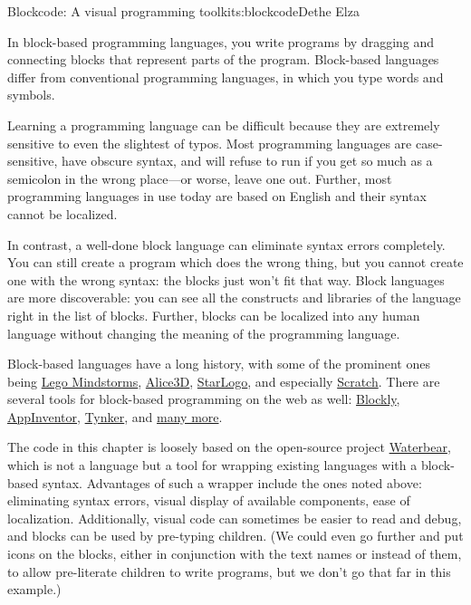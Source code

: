 \begin{aosachapter}{Blockcode: A visual programming toolkit}{s:blockcode}{Dethe Elza}

In block-based programming languages, you write programs by dragging and
connecting blocks that represent parts of the program. Block-based
languages differ from conventional programming languages, in which you
type words and symbols.

Learning a programming language can be difficult because they are
extremely sensitive to even the slightest of typos. Most programming
languages are case-sensitive, have obscure syntax, and will refuse to
run if you get so much as a semicolon in the wrong place---or worse,
leave one out. Further, most programming languages in use today are
based on English and their syntax cannot be localized.

In contrast, a well-done block language can eliminate syntax errors
completely. You can still create a program which does the wrong thing,
but you cannot create one with the wrong syntax: the blocks just won't
fit that way. Block languages are more discoverable: you can see all the
constructs and libraries of the language right in the list of blocks.
Further, blocks can be localized into any human language without
changing the meaning of the programming language.


Block-based languages have a long history, with some of the prominent
ones being \href{http://www.lego.com/en-us/mindstorms/}{Lego
Mindstorms}, \href{http://www.alice.org/index.php}{Alice3D},
\href{http://education.mit.edu/projects/starlogo-tng}{StarLogo}, and
especially \href{http://scratch.mit.edu/}{Scratch}. There are several
tools for block-based programming on the web as well:
\href{https://developers.google.com/blockly/}{Blockly},
\href{http://appinventor.mit.edu/explore/}{AppInventor},
\href{http://www.tynker.com/}{Tynker}, and
\href{http://en.wikipedia.org/wiki/Visual_programming_language}{many
more}.

The code in this chapter is loosely based on the open-source project
\href{http://waterbearlang.com/}{Waterbear}, which is not a language but
a tool for wrapping existing languages with a block-based syntax.
Advantages of such a wrapper include the ones noted above: eliminating
syntax errors, visual display of available components, ease of
localization. Additionally, visual code can sometimes be easier to read
and debug, and blocks can be used by pre-typing children. (We could even
go further and put icons on the blocks, either in conjunction with the
text names or instead of them, to allow pre-literate children to write
programs, but we don't go that far in this example.)


\end{aosachapter}
